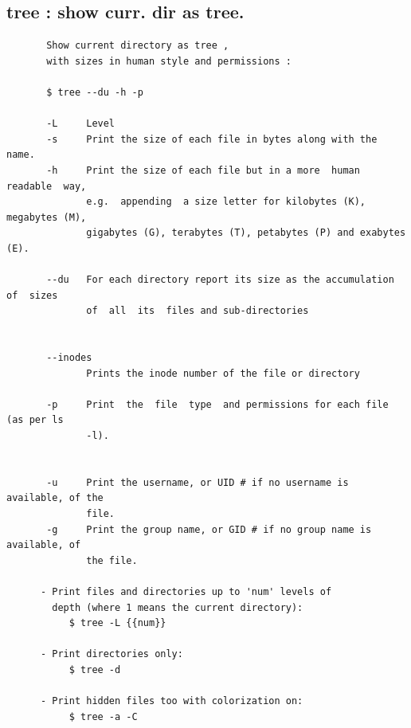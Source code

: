 \documentclass[a4paper,12pt]{article}
\begin{document}
\subsection{tree    : show curr. dir as tree.}
\begin{verbatim}
       Show current directory as tree , 
       with sizes in human style and permissions : 
               
       $ tree --du -h -p       
       
       -L     Level
       -s     Print the size of each file in bytes along with the name.
       -h     Print the size of each file but in a more  human  readable  way,
              e.g.  appending  a size letter for kilobytes (K), megabytes (M),
              gigabytes (G), terabytes (T), petabytes (P) and exabytes (E).             
       
       --du   For each directory report its size as the accumulation of  sizes
              of  all  its  files and sub-directories
              

       --inodes
              Prints the inode number of the file or directory
       
       -p     Print  the  file  type  and permissions for each file (as per ls
              -l).
     
       
       -u     Print the username, or UID # if no username is available, of the
              file.
       -g     Print the group name, or GID # if no group name is available, of
              the file.
            
      - Print files and directories up to 'num' levels of 
        depth (where 1 means the current directory):
           $ tree -L {{num}}

      - Print directories only:
           $ tree -d

      - Print hidden files too with colorization on:
           $ tree -a -C
       
       
\end{verbatim}
\end{document}

